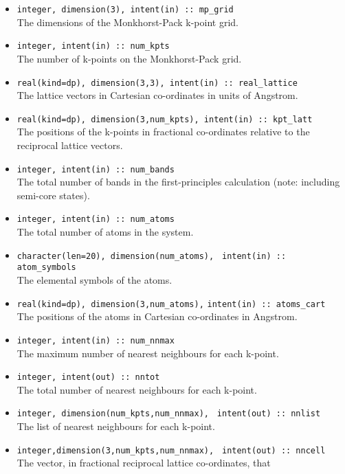 \begin{itemize}
\item \verb#integer, dimension(3), intent(in) :: mp_grid#\\ The
  dimensions of the {Monkhorst-Pack} k-point grid.
\item \verb#integer, intent(in) :: num_kpts#\\ The number of k-points on
  the {Monkhorst-Pack} grid.
\item \verb#real(kind=dp), dimension(3,3), intent(in) :: real_lattice#\\
  The lattice vectors in Cartesian co-ordinates in units of Angstrom.
\item
  \verb#real(kind=dp), dimension(3,num_kpts), intent(in) :: kpt_latt#\\
  The positions of the k-points in fractional co-ordinates
  relative to the reciprocal lattice vectors.
\item \verb#integer, intent(in) :: num_bands#\\ The total number of bands in the
first-principles calculation (note: including semi-core states).
\item \verb#integer, intent(in) :: num_atoms#\\ The total number of atoms
  in the system.
\item \verb#character(len=20), dimension(num_atoms),#
      \verb# intent(in) :: atom_symbols#\\ The elemental symbols of
      the atoms.
\item \verb#real(kind=dp), dimension(3,num_atoms),#
      \verb#intent(in) :: atoms_cart#\\ The positions of the atoms in
      Cartesian co-ordinates in Angstrom.
\item \verb#integer, intent(in) :: num_nnmax#\\ The
  maximum number of nearest neighbours for each k-point. 
\item \verb#integer, intent(out) :: nntot#\\ The
  total number of nearest neighbours for each k-point. 
\item \verb#integer, dimension(num_kpts,num_nnmax),#
      \verb# intent(out) :: nnlist#\\
      The list of nearest neighbours for each k-point.
\item \verb#integer,dimension(3,num_kpts,num_nnmax),#
      \verb# intent(out) :: nncell#\\ 
      The vector, in fractional reciprocal lattice co-ordinates, that

\end{itemize}
